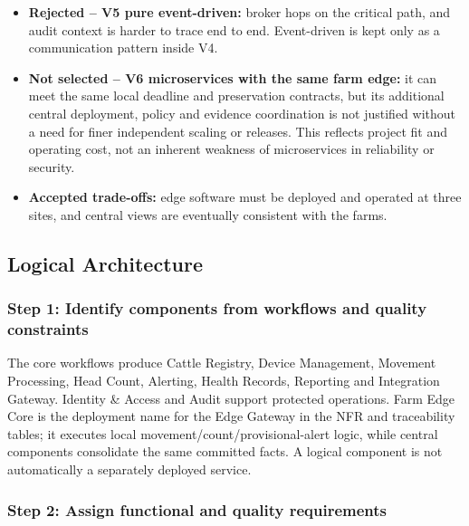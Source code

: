 \begin{itemize}
  \item \textbf{Rejected -- V5 pure event-driven:} broker hops on the critical path, and audit context is harder to trace end to end. Event-driven is kept only as a communication pattern inside V4.
  \item \textbf{Not selected -- V6 microservices with the same farm edge:} it can meet the same local deadline and preservation contracts, but its additional central deployment, policy and evidence coordination is not justified without a need for finer independent scaling or releases. This reflects project fit and operating cost, not an inherent weakness of microservices in reliability or security.
  \item \textbf{Accepted trade-offs:} edge software must be deployed and operated at three sites, and central views are eventually consistent with the farms.
\end{itemize}


\subsection{Logical Architecture}\label{sec:4.4}

\subsubsection{Step 1: Identify components from workflows and quality constraints}

The core workflows produce Cattle Registry, Device Management, Movement
Processing, Head Count, Alerting, Health Records, Reporting and
Integration Gateway. Identity \& Access and Audit support protected
operations. Farm Edge Core is the deployment name for the Edge Gateway
in the NFR and traceability tables; it executes local
movement/count/provisional-alert logic, while central components
consolidate the same committed facts. A logical component is not
automatically a separately deployed service.

\subsubsection{Step 2: Assign functional and quality requirements}

